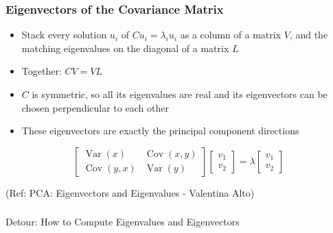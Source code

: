 \begin{frame}[fragile] \frametitle{Eigenvectors of the Covariance Matrix}
\begin{itemize}
\item Stack every solution $u_i$ of $C u_i = \lambda_i u_i$ as a column of a matrix $V$, and the matching eigenvalues on the diagonal of a matrix $L$
\item Together: $C V = VL$
\item $C$ is symmetric, so all its eigenvalues are real and its eigenvectors can be chosen perpendicular to each other
\item These eigenvectors are exactly the principal component directions
\end{itemize}

\[
\begin{bmatrix}
\operatorname{Var}(x) & \operatorname{Cov}(x,y) \\
\operatorname{Cov}(y,x) & \operatorname{Var}(y)
\end{bmatrix}
\begin{bmatrix} v_1 \\ v_2 \end{bmatrix}
= \lambda
\begin{bmatrix} v_1 \\ v_2 \end{bmatrix}
\]

{\tiny (Ref: PCA: Eigenvectors and Eigenvalues - Valentina Alto)}

\end{frame}

\begin{frame}[fragile]\frametitle{}
\begin{center}
{\Large Detour: How to Compute Eigenvalues and Eigenvectors}
\end{center}
\end{frame}



